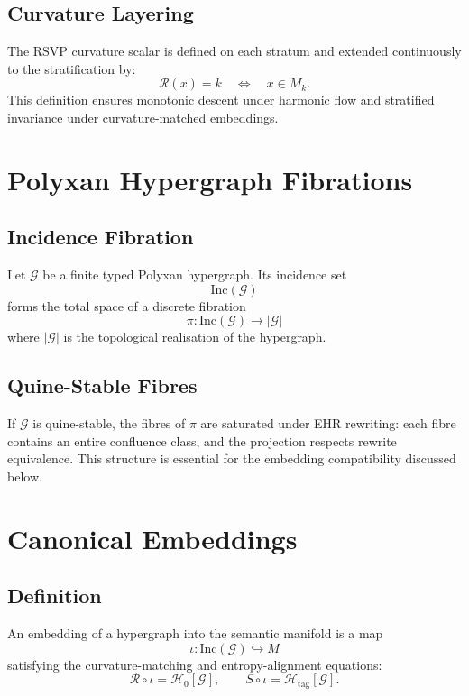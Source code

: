 \subsection{Curvature Layering}

The RSVP curvature scalar is defined on each stratum and extended continuously to the stratification by:
\[
\mathcal{R}(x) = k
\quad\Longleftrightarrow\quad
x \in M_k.
\]
This definition ensures monotonic descent under harmonic flow and stratified invariance under curvature-matched embeddings.

\section{Polyxan Hypergraph Fibrations}

\subsection{Incidence Fibration}

Let $\mathcal{G}$ be a finite typed Polyxan hypergraph. Its incidence set
\[
\mathrm{Inc}(\mathcal{G})
\]
forms the total space of a discrete fibration
\[
\pi : \mathrm{Inc}(\mathcal{G}) \to |\mathcal{G}|
\]
where $|\mathcal{G}|$ is the topological realisation of the hypergraph.

\subsection{Quine-Stable Fibres}

If $\mathcal{G}$ is quine-stable, the fibres of $\pi$ are saturated under EHR rewriting: each fibre contains an entire confluence class, and the projection respects rewrite equivalence. This structure is essential for the embedding compatibility discussed below.

\section{Canonical Embeddings}

\subsection{Definition}

An embedding of a hypergraph into the semantic manifold is a map
\[
\iota : \mathrm{Inc}(\mathcal{G}) \hookrightarrow M
\]
satisfying the curvature-matching and entropy-alignment equations:
\[
\mathcal{R}\circ \iota = \mathcal{H}_0[\mathcal{G}],
\qquad
S\circ \iota = \mathcal{H}_{\mathrm{tag}}[\mathcal{G}].
\]

